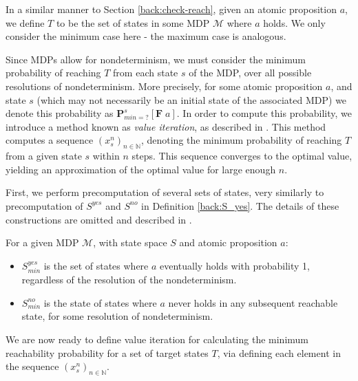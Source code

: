 In a similar manner to Section \ref{back:check-reach}, given an atomic proposition $a$, we define $T$ to be the set of states in some MDP $\mathcal{M}$ where $a$ holds. We only consider the minimum case here - the maximum case is analogous.

Since MDPs allow for nondeterminism, we must consider the minimum probability of reaching $T$ from each state $s$ of the MDP, over all possible resolutions of nondeterminism. More precisely, for some atomic proposition $a$, and state $s$ (which may not necessarily be an initial state of the associated MDP) we denote this probability as $\mathbf{P}^{s}_{min=?} [\mathbf{F} \; a]$. In order to compute this probability, we introduce a method known as \emph{value iteration}, as described in \cite{chatterjee_value_2008}. This method computes a sequence $(x^n_s)_{n \in \mathbb{N}}$, denoting the minimum probability of reaching $T$ from a given state $s$ within $n$ steps. This sequence converges to the optimal value, yielding an approximation of the optimal value for large enough $n$.

First, we perform precomputation of several sets of states, very similarly to precomputation of $S^{yes}$ and $S^{no}$ in Definition \ref{back:S_yes}.
The details of these constructions are omitted and described in \cite{forejt_automated_2011}. %

\begin{definition}
\label{cs1:yes_no}

For a given MDP $\mathcal{M}$, with state space $S$ and atomic proposition $a$:

\begin{itemize}
    \item $S^{yes}_{min}$ is the set of states where $a$ eventually holds with probability 1, regardless of the resolution of the nondeterminism.
    \item $S^{no}_{min}$ is the state of states where $a$ never holds in any subsequent reachable state, for some resolution of nondeterminism.
\end{itemize}
\end{definition}

We are now ready to define value iteration for calculating the minimum reachability probability for a set of target states $T$, via defining each element in the sequence $(x^n_s)_{n \in \mathbb{N}}$.


